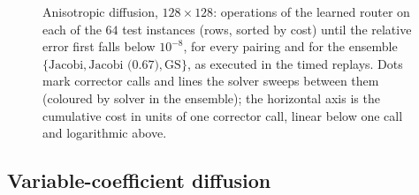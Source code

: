 \begin{table}[H]
\color{red}
\centering
\caption{Anisotropic diffusion: measured per-iteration costs and macro-action sizes.}
\resizebox{0.75\textwidth}{!}{\cacostsaniso}
\label{tab:ca_costs_aniso}
\end{table}

\begin{table}[H]
\color{red}
\centering
\caption{Anisotropic diffusion, $128\times128$: iteration-based metrics (conventions as in ).}
\resizebox{0.6\textwidth}{!}{\caaucaniso}
\label{tab:ca_auc_aniso}
\end{table}

\begin{table}[H]
\color{red}
\centering
\caption{Anisotropic diffusion, $128\times128$: five-seed router-training trials (conventions as in ).}
\resizebox{0.85\textwidth}{!}{\caseedsaniso}
\label{tab:ca_seeds_aniso}
\end{table}

\begin{figure}[H]
\color{red}
    \centering
    \caption{Anisotropic diffusion, $128\times128$: operations of the learned router on each of the $64$ test instances (rows, sorted by cost) until the relative error first falls below $10^{-8}$, for every pairing and for the ensemble $\{\text{Jacobi}, \text{Jacobi (0.67)}, \text{GS}\}$, as executed in the timed replays. Dots mark corrector calls and lines the solver sweeps between them (coloured by solver in the ensemble); the horizontal axis is the cumulative cost in units of one corrector call, linear below one call and logarithmic above.}
    \label{fig:ca_decisions_aniso}
\end{figure}

\subsection{Variable-coefficient diffusion} \label{sec:wc_varcoeff}

